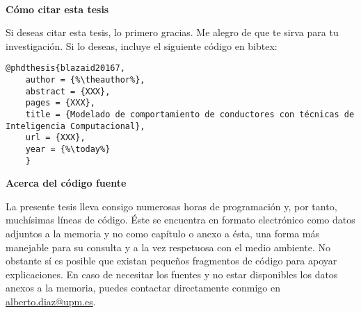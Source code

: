 \cleardoublepage
\begin{fullwidth}
~\vfill
\thispagestyle{empty}
\setlength{\parindent}{0pt}
\setlength{\parskip}{\baselineskip}

\par{
	\textbf{Cómo citar esta tesis}
	
	Si deseas citar esta tesis, lo primero gracias. Me alegro de que te sirva para tu investigación. Si lo deseas, incluye el siguiente código en bibtex:
	
	\begin{lstlisting}[escapechar=\%]
	@phdthesis{blazaid20167,
	author = {%\theauthor%},
	abstract = {XXX},
	pages = {XXX},
	title = {Modelado de comportamiento de conductores con técnicas de Inteligencia Computacional},
	url = {XXX},
	year = {%\today%}
	}
	\end{lstlisting}
}

\par{
	\textbf{Acerca del código fuente}
	
	La presente tesis lleva consigo numerosas horas de programación y, por tanto, muchísimas líneas de código. Éste se encuentra en formato electrónico como datos adjuntos a la memoria y no como capítulo o anexo a ésta, una forma más manejable para su consulta y a la vez respetuosa con el medio ambiente. No obstante sí es posible que existan pequeños fragmentos de código para apoyar explicaciones. En caso de necesitar los fuentes y no estar disponibles los datos anexos a la memoria, puedes contactar directamente conmigo en \url{alberto.diaz@upm.es}.
}

\end{fullwidth}

